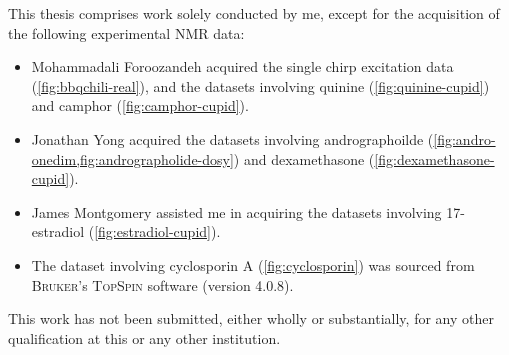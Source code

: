 \begin{declaration}
    This thesis comprises work solely conducted by me, except for the acquisition
    of the following experimental \acs{NMR} data:
    \begin{itemize}
        \item Mohammadali Foroozandeh acquired the single chirp
            excitation data (\cref{fig:bbqchili-real}), and the
            datasets involving quinine (\cref{fig:quinine-cupid}) and camphor
            (\cref{fig:camphor-cupid}).
        \item Jonathan Yong acquired the datasets involving
            andrographoilde (\cref{fig:andro-onedim,fig:andrographolide-dosy}) and
            dexamethasone (\cref{fig:dexamethasone-cupid}).
        \item James Montgomery assisted me in acquiring the datasets
             involving 17\textbeta-estradiol (\cref{fig:estradiol-cupid}).
         \item The dataset involving cyclosporin A (\cref{fig:cyclosporin}) was
             sourced from \textsc{Bruker}'s \textsc{TopSpin} software (version
             4.0.8).
    \end{itemize}
    This work has not been submitted, either wholly or substantially, for any
    other qualification at this or any other institution.
    \acresetall
\end{declaration}
